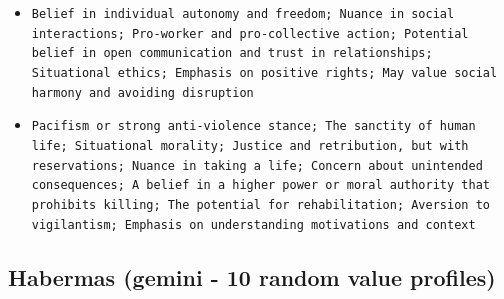 \documentclass[11pt]{article}
\begin{document}
\begin{itemize}
\item \texttt{Belief in individual autonomy and freedom; Nuance in social interactions; Pro-worker and pro-collective action; Potential belief in open communication and trust in relationships; Situational ethics; Emphasis on positive rights; May value social harmony and avoiding disruption}
\item \texttt{Pacifism or strong anti-violence stance; The sanctity of human life; Situational morality; Justice and retribution, but with reservations; Nuance in taking a life; Concern about unintended consequences; A belief in a higher power or moral authority that prohibits killing; The potential for rehabilitation; Aversion to vigilantism; Emphasis on understanding motivations and context}
\end{itemize}

\subsection{Habermas (gemini - 10 random value profiles)}
\end{document}
